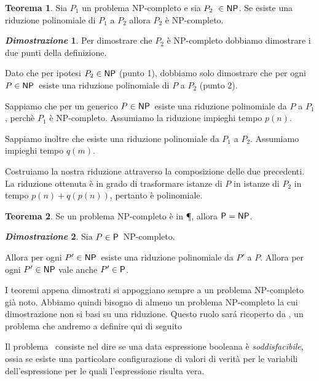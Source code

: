 \documentclass[12pt]{article}
\theoremstyle{definition}
\newtheorem*{mytheo}{Teorema}
\newtheorem*{myproof}{\em Dimostrazione}
\begin{document}
\begin{mytheo}
Sia \(P_1\) un problema NP-completo e sia \(P_2\ \in \NP\).
Se esiste una riduzione polinomiale di \(P_1\) a \(P_2\) allora \(P_2\) \`e NP-completo. 
\end{mytheo}

\begin{myproof}
Per dimostrare che \(P_2\) \`e NP-completo dobbiamo dimostrare i due punti della definizione.

Dato che per ipotesi \(P_2 \in \NP\) (punto 1), dobbiamo solo dimostrare che per ogni \(P \in \NP\)\ 
esiste una riduzione polinomiale di \(P\) a \(P_2\) (punto 2).

Sappiamo che per un generico \(P \in \NP\)\ esiste una riduzione polinomiale da \(P\) a \(P_1\),
perch\`e \(P_1\) \`e NP-completo. Assumiamo la riduzione impieghi tempo \(p(n)\).

Sappiamo inoltre che esiste una riduzione polinomiale da \(P_1\) a \(P_2\). Assumiamo impieghi tempo \(q(m)\).

Costruiamo la nostra riduzione attraverso la composizione delle due precedenti.
La riduzione ottenuta \`e in grado di trasformare istanze di \(P\) in istanze di \(P_2\)
in tempo \(p(n) + q(p(n))\), pertanto \`e polinomiale.

\hfill \qedsymbol
\end{myproof}

\begin{mytheo}
Se un problema NP-completo \`e in \P, allora \(\P=\NP\).
\end{mytheo}

\begin{myproof}
Sia \(P \in \P\)\ NP-completo.

Allora per ogni \(P' \in \NP\)\ esiste una riduzione polinomiale da \(P'\) a \(P\).\newline
Allora per ogni \(P' \in \NP\) vale anche \(P' \in \P\).

\hfill \qedsymbol
\end{myproof}

I teoremi appena dimostrati si appoggiano sempre a un problema NP-completo gi\`a noto.
Abbiamo quindi bisogno di almeno un problema NP-completo la cui dimostrazione non si basi su una riduzione.
Questo ruolo sar\'a ricoperto da \SAT, un problema che andremo a definire qui di seguito

Il problema \SAT\ consiste nel dire se una data espressione booleana \`e {\em soddisfacibile},
ossia se esiste una particolare configurazione di valori di verit\`a per le variabili dell'espressione
per le quali l'espressione risulta vera.
\end{document}
